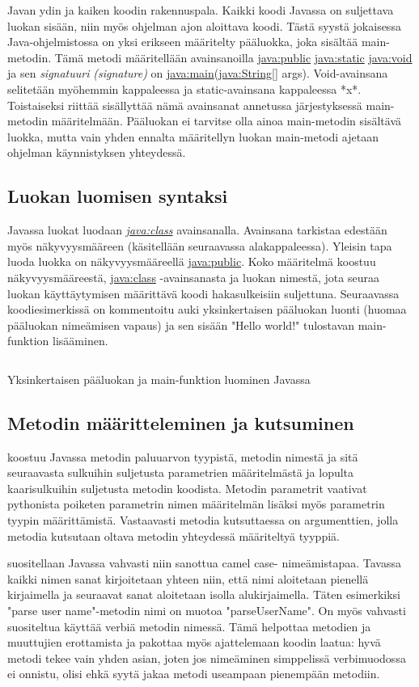 \documentclass{tufte-book}
\newcommand{\eng}[1]{\textit{(#1)}}
\newcommand{\new}[1]{\textit{\gls{#1}}}
\newcommand{\neweng}[2]{\new{#1} \eng{#2}}
\newcommand{\java}[1]{\underline{\gls{java:#1}}}
\newcommand{\newjava}[1]{\textit{\java{#1}}}
\newcommand{\code}[3]{
\begin{listing}
    \inputminted{java}{OhjelmointiopasEsimerkit/src/#1/#2.java}
    \caption{#3}
    \label{Java-#1-#2}
\end{listing}
}
\begin{document}
 Javan ydin ja kaiken koodin rakennuspala. Kaikki koodi Javassa on
suljettava luokan sisään, niin myös ohjelman ajon aloittava koodi. Tästä syystä jokaisessa
Java-ohjelmistossa on yksi erikseen määritelty pääluokka, joka sisältää main-metodin. Tämä
metodi määritellään avainsanoilla \java{public} \java{static} \java{void} ja sen 
\neweng{signatuuri}{signature} on \java{main}(\java{String}[] args). Void-avainsana selitetään
myöhemmin kappaleessa ja static-avainsana kappaleessa *x*. %
Toistaiseksi riittää sisällyttää nämä avainsanat annetussa järjestyksessä main-metodin
määritelmään. Pääluokan ei tarvitse olla ainoa main-metodin sisältävä luokka, mutta vain yhden
ennalta määritellyn luokan main-metodi ajetaan ohjelman käynnistyksen yhteydessä.

\subsection{Luokan luomisen syntaksi}

 Javassa luokat luodaan \newjava{class} avainsanalla. Avainsana
tarkistaa edestään myös näkyvyysmääreen (käsitellään seuraavassa alakappaleessa). Yleisin tapa
luoda luokka on näkyvyysmääreellä \java{public}. Koko määritelmä koostuu näkyvyysmääreestä,
\java{class} -avainsanasta ja luokan nimestä, jota seuraa luokan käyttäytymisen määrittävä koodi
hakasulkeisiin suljettuna. Seuraavassa koodiesimerkissä on kommentoitu auki yksinkertaisen
pääluokan luonti (huomaa pääluokan nimeämisen vapaus) ja sen sisään "Hello world!" tulostavan
main-funktion lisääminen.

\code{week2}{HelloWorld}{Yksinkertaisen pääluokan ja main-funktion luominen Javassa}

\subsection{Metodin määritteleminen ja kutsuminen}

 koostuu Javassa metodin paluuarvon tyypistä, metodin nimestä
ja sitä seuraavasta sulkuihin suljetusta parametrien määritelmästä ja lopulta kaarisulkuihin
suljetusta metodin koodista. Metodin parametrit vaativat pythonista poiketen parametrin nimen
määritelmän lisäksi myös parametrin tyypin määrittämistä. Vastaavasti metodia kutsuttaessa on
argumenttien, jolla metodia kutsutaan oltava metodin yhteydessä määriteltyä tyyppiä.

 suositellaan Javassa vahvasti niin sanottua camel case-
nimeämistapaa. Tavassa kaikki nimen sanat kirjoitetaan yhteen niin, että nimi aloitetaan
pienellä kirjaimella ja seuraavat sanat aloitetaan isolla alukirjaimella. Täten esimerkiksi
"parse user name"-metodin nimi on muotoa "parseUserName". On myös vahvasti suositeltua käyttää
verbiä metodin nimessä. Tämä helpottaa metodien ja muuttujien erottamista ja pakottaa
myös ajattelemaan koodin laatua: hyvä metodi tekee vain yhden asian, joten jos nimeäminen
simppelissä verbimuodossa ei onnistu, olisi ehkä syytä jakaa metodi useampaan pienempään
metodiin.
\end{document}
